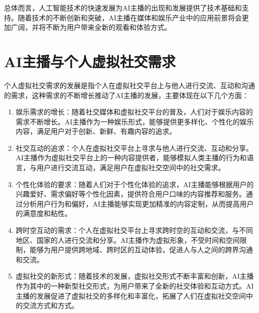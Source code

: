 \documentclass[11pt, a4paper, oneside]{ctexbook}
\begin{document}
总体而言，人工智能技术的快速发展为AI主播的出现和发展提供了技术基础和支持。随着技术的不断创新和突破，AI主播在媒体和娱乐产业中的应用前景将会更加广阔，并将不断为用户带来全新的观看和体验方式。
\section{AI主播与个人虚拟社交需求}
个人虚拟社交需求的发展是指个人在虚拟社交平台上与他人进行交流、互动和沟通的需求，这种需求的不断增长推动了AI主播的发展，主要体现在以下几个方面：
\begin{enumerate}
    \item 娱乐需求的增长：随着社交媒体和虚拟社交平台的普及，人们对于娱乐内容的需求不断增长。AI主播作为一种娱乐形式，能够提供更多样化、个性化的娱乐内容，满足用户对于创新、新鲜、有趣内容的追求。
    \item 社交互动的追求：个人在虚拟社交平台上寻求与他人进行交流、互动和分享。AI主播作为虚拟社交平台上的一种内容提供者，能够模拟人类主播的行为和语言，与用户进行交流互动，满足用户在虚拟社交空间中的社交需求。
    \item 个性化体验的要求：随着人们对于个性化体验的追求，AI主播能够根据用户的兴趣爱好、需求偏好等个性化因素，提供符合用户口味的内容推荐和服务。通过分析用户行为和偏好，AI主播能够实现更加精准的内容定制，从而提高用户的满意度和粘性。
    \item 跨时空互动的需求：个人在虚拟社交平台上寻求跨时空的互动和交流，与不同地区、国家的人进行交流和分享。AI主播作为虚拟形象，不受时间和空间限制，能够为用户提供跨地域、跨时区的互动体验，促进人与人之间的跨界沟通和交流。
    \item 虚拟社交的新形式：随着技术的发展，虚拟社交形式不断丰富和创新，AI主播作为其中的一种新型社交形式，为用户带来了全新的社交体验和互动方式。AI主播的发展促进了虚拟社交的多样化和丰富化，拓展了人们在虚拟社交空间中的交流方式和方式。
\end{enumerate}
\end{document}

